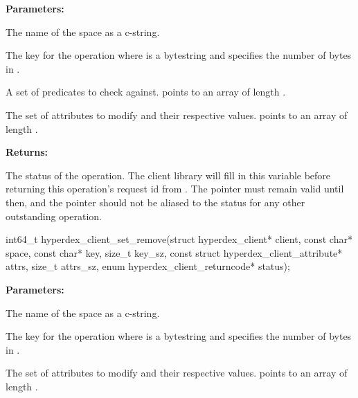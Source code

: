 \noindent\textbf{Parameters:}
\begin{description}[labelindent=\widthof{{\code{checks}, \code{checks\_sz}}},leftmargin=*,noitemsep,nolistsep,align=right]
\item[\code{space}] The name of the space as a c-string.
\item[\code{key}, \code{key\_sz}] The key for the operation where  is a bytestring and  specifies the number of bytes in .
\item[\code{checks}, \code{checks\_sz}] A set of predicates to check against.   points to an array of length .
\item[\code{attrs}, \code{attrs\_sz}] The set of attributes to modify and their respective values.   points to an array of length .
\end{description}

\noindent\textbf{Returns:}
\begin{description}[labelindent=\widthof{{\code{status}}},leftmargin=*,noitemsep,nolistsep,align=right]
\item[\code{status}] The status of the operation.  The client library will fill in this variable before returning this operation's request id from .  The pointer must remain valid until then, and the pointer should not be aliased to the status for any other outstanding operation.
\end{description}

\funcsep
{}
\begin{ccode}
int64_t hyperdex_client_set_remove(struct hyperdex_client* client,
                const char* space,
                const char* key, size_t key_sz,
                const struct hyperdex_client_attribute* attrs, size_t attrs_sz,
                enum hyperdex_client_returncode* status);
\end{ccode}
\funcdesc 

\noindent\textbf{Parameters:}
\begin{description}[labelindent=\widthof{{\code{attrs}, \code{attrs\_sz}}},leftmargin=*,noitemsep,nolistsep,align=right]
\item[\code{space}] The name of the space as a c-string.
\item[\code{key}, \code{key\_sz}] The key for the operation where  is a bytestring and  specifies the number of bytes in .
\item[\code{attrs}, \code{attrs\_sz}] The set of attributes to modify and their respective values.   points to an array of length .
\end{description}

